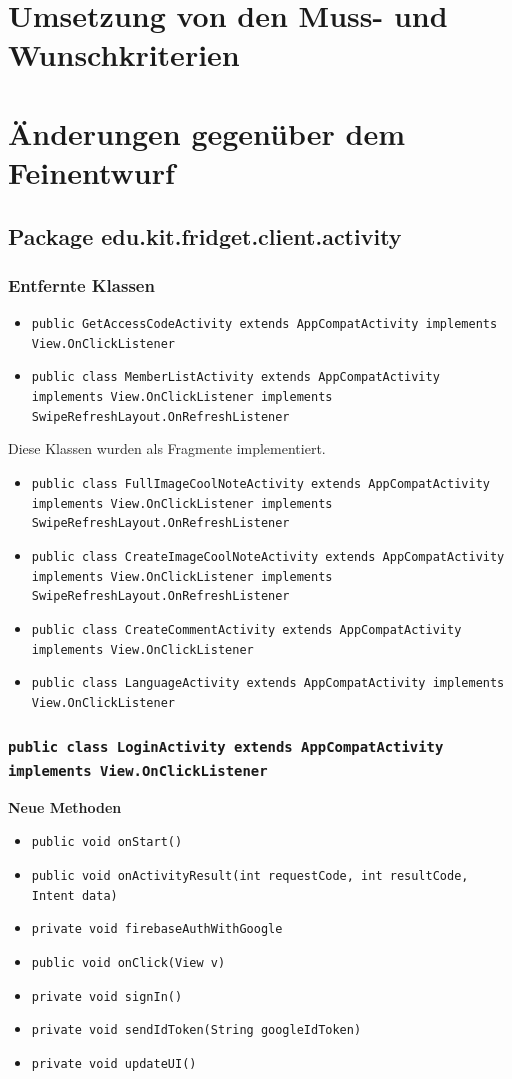 \documentclass[a4paper]{scrreprt}
\begin{document}
	\chapter{Umsetzung von den Muss- und Wunschkriterien}
	
	\chapter{Änderungen gegenüber dem Feinentwurf}
	
	\section{Package edu.kit.fridget.client.activity}
		\subsection{Entfernte Klassen}
			\begin{itemize}
				\item \texttt{public GetAccessCodeActivity extends AppCompatActivity implements View.OnClickListener}
				\item \texttt{public class MemberListActivity extends AppCompatActivity implements View.OnClickListener implements SwipeRefreshLayout.OnRefreshListener}
			\end{itemize}
			Diese Klassen wurden als Fragmente implementiert.
			\begin{itemize}
				\item \texttt{public class FullImageCoolNoteActivity extends AppCompatActivity implements View.OnClickListener implements SwipeRefreshLayout.OnRefreshListener}
				\item \texttt{public class CreateImageCoolNoteActivity extends AppCompatActivity implements View.OnClickListener implements SwipeRefreshLayout.OnRefreshListener}
				\item \texttt{public class CreateCommentActivity extends AppCompatActivity implements View.OnClickListener}
				\item \texttt{public class LanguageActivity extends AppCompatActivity implements View.OnClickListener}
			\end{itemize}
		\subsection{\texttt{public class LoginActivity extends AppCompatActivity implements View.OnClickListener}}
			\textbf{Neue Methoden}
			\begin{itemize}
				\item \texttt{public void onStart()}
				\item \texttt{public void onActivityResult(int requestCode, int resultCode, Intent data)}
				\item \texttt{private void firebaseAuthWithGoogle}
				\item \texttt{public void onClick(View v)}
				\item \texttt{private void signIn()}
				\item \texttt{private void sendIdToken(String googleIdToken)}
				\item \texttt{private void updateUI()}
			\end{itemize}
\end{document}
